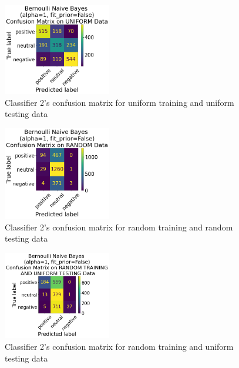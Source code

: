 \documentclass[11pt]{article}
\begin{document}
\begin{figure}[!h]
	\centering
	\includegraphics[width = 0.42\textwidth]{cf/BernoulliNaiveBayesalpha1fit_priorFalse-Uniform-confusion-matrix.png}
	\caption{Classifier 2's confusion matrix for uniform training and uniform testing data}
	\label{fig:cf-2nd-uu}
\end{figure} 

\begin{figure}[!h]
	\centering
	\includegraphics[width = 0.42\textwidth]{cf/BernoulliNaiveBayesalpha1fit_priorFalse-Random-confusion-matrix.png}
	\caption{Classifier 2's confusion matrix for random training and random testing data}
	\label{fig:cf-2nd-rr}
\end{figure} 

\begin{figure}[!h]
	\centering
	\includegraphics[width = 0.42\textwidth]{cf/BernoulliNaiveBayesalpha1fit_priorFalse-RandomTrainingandUniformTesting-confusion-matrix.png}
	\caption{Classifier 2's confusion matrix for random training and uniform testing data}
	\label{fig:cf-2nd-ru}
\end{figure} 
\end{document}
